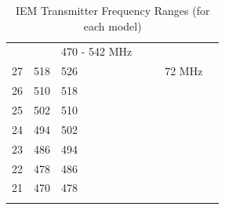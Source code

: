 \begin{longtable}[H]{|p{1cm}|p{1cm}|p{1cm}|cc|cc|}
                  \multicolumn{1}{c|}{\cellcolor[HTML]{FF3131}} &
                   &
                  \multicolumn{1}{c|}{\cellcolor[HTML]{FF3131}470 - 542 MHz} &
                   \\ \cline{1-3}
                \cellcolor[HTML]{9AFF99}27 &
                  \cellcolor[HTML]{9AFF99}518 &
                  \cellcolor[HTML]{9AFF99}526 &
                  \multicolumn{1}{c|}{\cellcolor[HTML]{FF3131}} &
                   &
                  \multicolumn{1}{c|}{\cellcolor[HTML]{FF3131}72 MHz} &
                   \\ \cline{1-3}
                \cellcolor[HTML]{9AFF99}26 &
                  \cellcolor[HTML]{9AFF99}510 &
                  \cellcolor[HTML]{9AFF99}518 &
                  \multicolumn{1}{c|}{\cellcolor[HTML]{FF3131}} &
                   &
                  \multicolumn{1}{c|}{\cellcolor[HTML]{FF3131}} &
                   \\ \cline{1-4}
                \cellcolor[HTML]{9AFF99}25 &
                  \cellcolor[HTML]{9AFF99}502 &
                  \cellcolor[HTML]{9AFF99}510 &
                   &
                   &
                  \multicolumn{1}{c|}{\cellcolor[HTML]{FF3131}} &
                   \\ \cline{1-3}
                \cellcolor[HTML]{9AFF99}24 &
                  \cellcolor[HTML]{9AFF99}494 &
                  \cellcolor[HTML]{9AFF99}502 &
                   &
                   &
                  \multicolumn{1}{c|}{\cellcolor[HTML]{FF3131}} &
                   \\ \cline{1-3}
                \cellcolor[HTML]{9AFF99}23 &
                  \cellcolor[HTML]{9AFF99}486 &
                  \cellcolor[HTML]{9AFF99}494 &
                   &
                   &
                  \multicolumn{1}{c|}{\cellcolor[HTML]{FF3131}} &
                   \\ \cline{1-3}
                \cellcolor[HTML]{9AFF99}22 &
                  \cellcolor[HTML]{9AFF99}478 &
                  \cellcolor[HTML]{9AFF99}486 &
                   &
                   &
                  \multicolumn{1}{c|}{\cellcolor[HTML]{FF3131}} &
                   \\ \cline{1-3}
                \cellcolor[HTML]{9AFF99}21 &
                  \cellcolor[HTML]{9AFF99}470 &
                  \cellcolor[HTML]{9AFF99}478 &
                   &
                   &
                  \multicolumn{1}{c|}{\cellcolor[HTML]{FF3131}} &
                   \\ \hline

                \caption{IEM Transmitter Frequency Ranges (for each model)}
                \label{tab:iem_transmitter_freq_ranges}
            \end{longtable}

